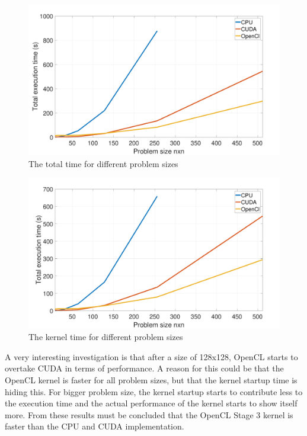 \documentclass[final]{report}
\begin{document}
\begin{figure}[H]
\centering
    \includegraphics[width=\textwidth]{resources/exe-time-per-problem-size-graph.pdf}
    \caption{The total time for different problem sizes}
    \label{fig:exe-time-per-problem-size-graph}
\end{figure}

\begin{figure}[H]
\centering
    \includegraphics[width=\textwidth]{resources/kernel-time-per-problem-size-graph.pdf}
    \caption{The kernel time for different problem sizes}
    \label{fig:kernel-time-per-problem-size-graph}
\end{figure}

A very interesting investigation is that after a size of 128x128, OpenCL starts to overtake CUDA in terms of performance.
A reason for this could be that the OpenCL kernel is faster for all problem sizes, but that the kernel startup time is hiding this.
For bigger problem size, the kernel startup starts to contribute less to the execution time and the actual performance of the kernel starts to show itself more.
From these results must be concluded that the OpenCL Stage 3 kernel is faster than the CPU and CUDA implementation. 
\end{document}
